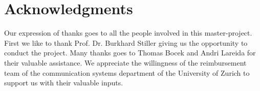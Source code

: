 \chapter*{Acknowledgments}

Our expression of thanks goes to all the people involved in this master-project. First we like to thank Prof. Dr. Burkhard Stiller giving us the opportunity to conduct the project. Many thanks goes to Thomas Bocek and Andri Lareida for their valuable assistance. We appreciate the willingness of the reimbursement team of the communication systems department of the University of Zurich to support us with their valuable inputs.